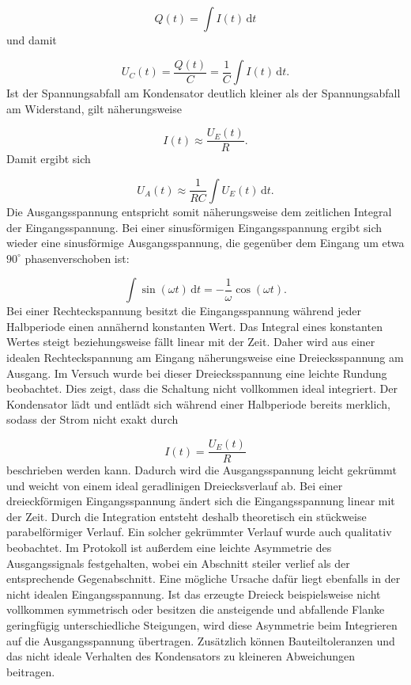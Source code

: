 \documentclass{report}
\begin{document}
\begin{equation}
Q(t)=\int I(t)\,\mathrm{d}t
\end{equation}
\noindent
und damit

\begin{equation}
U_C(t)=\frac{Q(t)}{C}
=\frac{1}{C}\int I(t)\,\mathrm{d}t.
\end{equation}
\noindent
Ist der Spannungsabfall am Kondensator deutlich kleiner als der Spannungsabfall am Widerstand, gilt näherungsweise

\begin{equation}
I(t)\approx\frac{U_E(t)}{R}.
\end{equation}
\noindent
Damit ergibt sich

\begin{equation}
\boxed{
U_A(t)\approx
\frac{1}{RC}
\int U_E(t)\,\mathrm{d}t
}.
\end{equation}
\noindent
Die Ausgangsspannung entspricht somit näherungsweise dem zeitlichen Integral der Eingangsspannung.
\noindent
Bei einer sinusförmigen Eingangsspannung ergibt sich wieder eine sinusförmige Ausgangsspannung, die gegenüber dem Eingang um etwa $90^\circ$ phasenverschoben ist:

\begin{equation}
\int\sin(\omega t)\,\mathrm{d}t
=
-\frac{1}{\omega}\cos(\omega t).
\end{equation}
\noindent
Bei einer Rechteckspannung besitzt die Eingangsspannung während jeder Halbperiode einen annähernd konstanten Wert. Das Integral eines konstanten Wertes steigt beziehungsweise fällt linear mit der Zeit. Daher wird aus einer idealen Rechteckspannung am Eingang näherungsweise eine Dreiecksspannung am Ausgang.
\noindent
Im Versuch wurde bei dieser Dreiecksspannung eine leichte Rundung beobachtet. Dies zeigt, dass die Schaltung nicht vollkommen ideal integriert. Der Kondensator lädt und entlädt sich während einer Halbperiode bereits merklich, sodass der Strom nicht exakt durch

\begin{equation}
I(t)=\frac{U_E(t)}{R}
\end{equation}
\noindent
beschrieben werden kann. Dadurch wird die Ausgangsspannung leicht gekrümmt und weicht von einem ideal geradlinigen Dreiecksverlauf ab.
\noindent
Bei einer dreieckförmigen Eingangsspannung ändert sich die Eingangsspannung linear mit der Zeit. Durch die Integration entsteht deshalb theoretisch ein stückweise parabelförmiger Verlauf. Ein solcher gekrümmter Verlauf wurde auch qualitativ beobachtet. Im Protokoll ist außerdem eine leichte Asymmetrie des Ausgangssignals festgehalten, wobei ein Abschnitt steiler verlief als der entsprechende Gegenabschnitt.
\noindent
Eine mögliche Ursache dafür liegt ebenfalls in der nicht idealen Eingangsspannung. Ist das erzeugte Dreieck beispielsweise nicht vollkommen symmetrisch oder besitzen die ansteigende und abfallende Flanke geringfügig unterschiedliche Steigungen, wird diese Asymmetrie beim Integrieren auf die Ausgangsspannung übertragen. Zusätzlich können Bauteiltoleranzen und das nicht ideale Verhalten des Kondensators zu kleineren Abweichungen beitragen.
\end{document}

